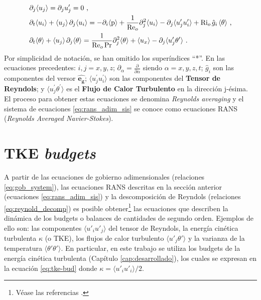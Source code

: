 \begin{equation}
\begin{aligned}
& \partial_j \langle u_j \rangle = \partial_j  u^{\prime}_j = 0 \text{ ,}\\
& \partial_t \langle u_i \rangle + \langle u_j \rangle \hspace{0.5mm} \partial_j \langle u_i \rangle = - \partial_i  \langle \text{p} \rangle  + \frac{1}{\text{Re}_o} \partial^2_j \langle u_i \rangle - \partial_j \langle u^{\prime}_j u^{\prime}_i \rangle + \text{Ri}_o \hspace{0.5mm} \hat{g}_i \hspace{0.5mm} \langle \theta \rangle  \text{ ,} \\
& \partial_t \langle \theta \rangle + \langle u_j \rangle \hspace{0.5mm} \partial_j \langle \theta \rangle = \frac{1}{\text{Re}_o \hspace{0.5mm} \text{Pr}} \partial^2_j \langle \theta \rangle + \langle u_x \rangle - \partial_j \langle u^{\prime}_j \theta^{\prime} \rangle  \text{ .}
\label{eq:rans_adim_sis}
\end{aligned}
\end{equation} 
Por simplicidad de notación, se han omitido los superíndices ``*''. En las ecuaciones precedentes: $i,j=x,y,z$; $\partial_{\alpha} = \frac{\partial}{\partial \alpha }$ siendo ${\alpha}=x,y,z,t$; $\hat{g}_i$ son las componentes del versor $\widehat{\mathbf{e_g}}$; $\langle u^{\prime}_j u^{\prime}_i \rangle$ son las componentes del \textbf{Tensor de Reyndols}; y $\langle u^{\prime}_j \theta^{\prime} \rangle$ es el \textbf{Flujo de Calor Turbulento} en la dirección j-ésima. El proceso para obtener estas ecuaciones se denomina \textit{Reynolds averaging} y el sistema de ecuaciones \ref{eq:rans_adim_sis} se conoce como ecuaciones RANS (\textit{Reynolds Averaged Navier-Stokes}).


\section{TKE \textit{budgets}}

A partir de las ecuaciones de gobierno adimensionales (relaciones \ref{eq:gob_system}), las ecuaciones RANS descritas en la sección anterior (ecuaciones \ref{eq:rans_adim_sis}) y la descomposición de Reyndols (relaciones \ref{eq:reynold_decomp}) es posible obtener\footnote{Véase las referencias \cite{pope2001turbulent, kundu, durbin}.} las ecuaciones que describen la dinámica de los budgets o balances de cantidades de segundo orden. Ejemplos de ello son: las componentes $\langle u'_i u'_j \rangle$ del tensor de Reyndols, la energía cinética turbulenta $\kappa$ (o TKE), los flujos de calor turbulento $\langle u'_j \theta' \rangle$ y la varianza de la temperatura $\langle \theta' \theta' \rangle$. En particular, en este trabajo se utiliza los budgets de la energía cinética turbulenta (Capítulo \ref{cap:desarrollado}), los cuales se expresan en la ecuación \ref{eq:tke-bud} donde $\kappa = \langle u'_i u'_i \rangle / 2$.  

